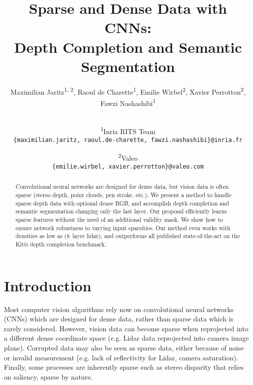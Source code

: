 \documentclass[10pt,twocolumn,letterpaper]{article}
\begin{document}
\title{Sparse and Dense Data with CNNs:\\Depth Completion and Semantic Segmentation}



\author{
Maximilian Jaritz\textsuperscript{1, 2}, Raoul de Charette\textsuperscript{1}, Emilie Wirbel\textsuperscript{2}, Xavier Perrotton\textsuperscript{2}, Fawzi Nashashibi\textsuperscript{1}\\\\
	\and
	\textsuperscript{1}Inria RITS Team\\
	{\tt\small \{maximilian.jaritz, raoul.de-charette, fawzi.nashashibi\}@inria.fr}
	\and
	\textsuperscript{2}Valeo\\
	{\tt\small \{emilie.wirbel, xavier.perrotton\}@valeo.com}
}

\maketitle


\begin{abstract}
Convolutional neural networks are designed for dense data, but vision data is often sparse (stereo depth, point clouds, pen stroke, etc.).
We present a method to handle sparse depth data with optional dense RGB, and accomplish depth completion and semantic segmentation changing only the last layer. 
Our proposal efficiently learns sparse features without the need of an additional validity mask.
We show how to ensure network robustness to varying input sparsities. Our method even works with densities as low as  (8~layer lidar), and outperforms all published state-of-the-art on the Kitti depth completion benchmark.
\end{abstract}

\section{Introduction}

Most computer vision algorithms rely now on convolutional neural networks (CNNs) which are designed for dense data, rather than sparse data which is rarely considered.
However, vision data can become sparse when reprojected into a different dense coordinate space
(e.g. Lidar data reprojected into camera image plane).
Corrupted data may also be seen as sparse data, either because of noise or invalid measurement (e.g. lack of reflectivity for Lidar, camera saturation).
Finally, some processes are inherently sparse such as stereo disparity that relies on saliency, sparse by nature.
\end{document}
